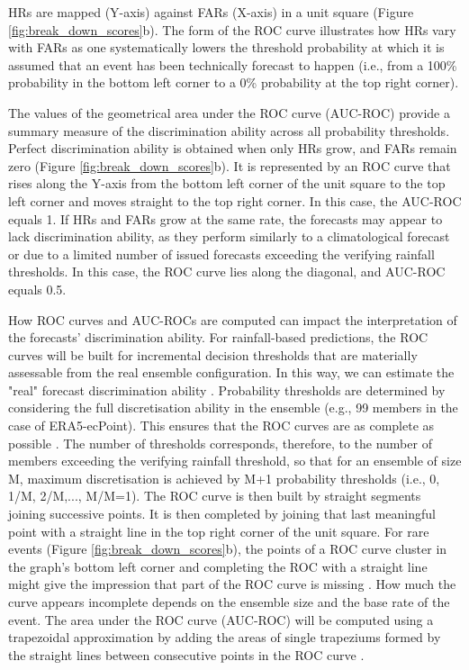 \noindent HRs are mapped (Y-axis) against FARs (X-axis) in a unit square (Figure \ref{fig:break_down_scores}b). The form of the ROC curve illustrates how HRs vary with FARs as one systematically lowers the threshold probability at which it is assumed that an event has been technically forecast to happen (i.e., from a 100\% probability in the bottom left corner to a 0\% probability at the top right corner). 

The  values of the geometrical area under the ROC curve (AUC-ROC) provide a summary measure of the discrimination ability across all probability thresholds. Perfect discrimination ability is obtained when only HRs grow, and FARs remain zero (Figure \ref{fig:break_down_scores}b). It is represented by an ROC curve that rises along the Y-axis from the bottom left corner of the unit square to the top left corner and moves straight to the top right corner. In this case, the AUC-ROC equals 1. If HRs and FARs grow at the same rate, the forecasts may appear to lack discrimination ability, as they perform similarly to a climatological forecast or due to a limited number of issued forecasts exceeding the verifying rainfall thresholds. In this case, the ROC curve lies along the diagonal, and AUC-ROC equals 0.5. 

How  ROC curves and AUC-ROCs are computed can impact the interpretation of the forecasts' discrimination ability. For rainfall-based predictions, the ROC curves will be built for incremental decision thresholds that are materially assessable from the real ensemble configuration. In this way, we can estimate the "real" forecast discrimination ability \citep{Wilks_2020}. Probability thresholds are determined by considering the full discretisation ability in the ensemble (e.g., 99 members in the case of ERA5-ecPoint). This ensures that the ROC curves are as complete as possible \citep{Bouallegue_2022}. The number of thresholds corresponds, therefore, to the number of members exceeding the verifying rainfall threshold, so that for an ensemble of size M, maximum discretisation is achieved by M+1 probability thresholds (i.e., 0, 1/M, 2/M,..., M/M=1). The ROC curve is then built by straight segments joining successive points. It is then completed by joining that last meaningful point with a straight line in the top right corner of the unit square. For rare events (Figure \ref{fig:break_down_scores}b), the points of a ROC curve cluster in the graph's bottom left corner and completing the ROC with a straight line might give the impression that part of the ROC curve is missing \citep{Casati_2008}. How much the curve appears incomplete depends on the ensemble size and the base rate of the event. The area under the ROC curve (AUC-ROC) will be computed using a trapezoidal approximation by adding the areas of single trapeziums formed by the straight lines between consecutive points in the ROC curve \citep{Bouallegue_2022}. 

